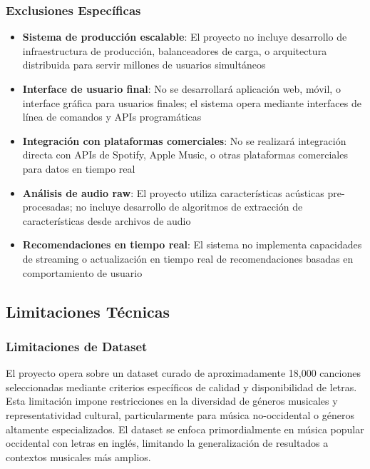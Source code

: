 \documentclass[12pt,a4paper]{article}
\begin{document}
\subsubsection{Exclusiones Específicas}

\begin{itemize}
    \item \textbf{Sistema de producción escalable}: El proyecto no incluye desarrollo de infraestructura de producción, balanceadores de carga, o arquitectura distribuida para servir millones de usuarios simultáneos
    \item \textbf{Interface de usuario final}: No se desarrollará aplicación web, móvil, o interface gráfica para usuarios finales; el sistema opera mediante interfaces de línea de comandos y APIs programáticas
    \item \textbf{Integración con plataformas comerciales}: No se realizará integración directa con APIs de Spotify, Apple Music, o otras plataformas comerciales para datos en tiempo real
    \item \textbf{Análisis de audio raw}: El proyecto utiliza características acústicas pre-procesadas; no incluye desarrollo de algoritmos de extracción de características desde archivos de audio
    \item \textbf{Recomendaciones en tiempo real}: El sistema no implementa capacidades de streaming o actualización en tiempo real de recomendaciones basadas en comportamiento de usuario
\end{itemize}

\subsection{Limitaciones Técnicas}

\subsubsection{Limitaciones de Dataset}

El proyecto opera sobre un dataset curado de aproximadamente 18,000 canciones seleccionadas mediante criterios específicos de calidad y disponibilidad de letras. Esta limitación impone restricciones en la diversidad de géneros musicales y representatividad cultural, particularmente para música no-occidental o géneros altamente especializados. El dataset se enfoca primordialmente en música popular occidental con letras en inglés, limitando la generalización de resultados a contextos musicales más amplios.
\end{document}
